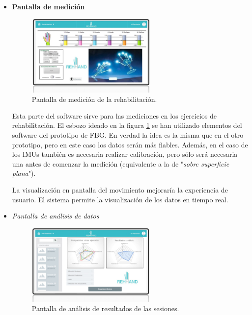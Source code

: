 \begin{itemize}
	\item \textbf{Pantalla de medición}
	
	\begin{figure}[H]
		\centering
		\includegraphics[width=0.6\textwidth]{./img/softwareIMU1}
		\caption{Pantalla de medición de la rehabilitación. } 
		\label{fig:softIMU1}
	\end{figure} 
	 
	 Esta parte del software sirve para las mediciones en los ejercicios de rehabilitación. El esbozo ideado en la figura \ref{fig:softIMU1} se han utilizado elementos del software del prototipo de FBG. En verdad la idea es la misma que en el otro prototipo, pero en este caso los datos serán más fiables. Además, en el caso de los IMUs también es necesaria realizar calibración, pero sólo será necesaria una antes de comenzar la medición (equivalente a la de "\textit{sobre superficie plana}").
	 
	 La visualización en pantalla del movimiento mejoraría la experiencia de usuario. El sistema permite la visualización de los datos en tiempo real.
	
	\item \textit{Pantalla de análisis de datos}
	
	\begin{figure}[H]
		\centering
		\includegraphics[width=0.6\textwidth]{./img/softwareIMU2}
		\caption{Pantalla de análisis de resultados de las sesiones. } 
		\label{fig:softIMU2}
	\end{figure} 
	

\end{itemize}
